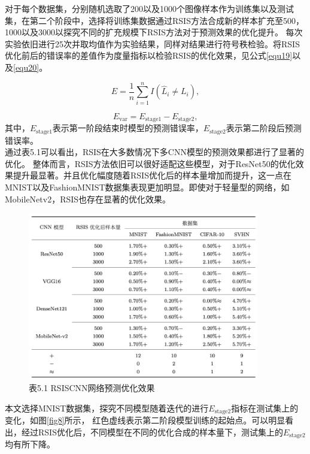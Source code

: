\documentclass{NauThesis}
\begin{document}
对于每个数据集，分别随机选取了200以及1000个图像样本作为训练集以及测试集，在第二个阶段中，选择将训练集数据通过RSIS方法合成新的样本扩充至500，1000以及3000以探究不同的扩充规模下RSIS方法对于预测效果的优化提升。
每次实验依旧进行25次并取均值作为实验结果，同样对结果进行符号秩检验。将RSIS优化前后的错误率的差值作为度量指标以检验RSIS的优化效果，见公式\eqref{equ19}以及\eqref{equ20}。

\begin{equation}\label{equ19}
    E=\dfrac{1}{n}\sum\limits_{i=1}^n{I}(\hat{L}_i\neq L_i),
\end{equation}

\begin{equation}\label{equ20}
    E_{\text{var}}=E_{\text{stage1}}-E_{\text{stage2}},
\end{equation}
其中，$E_{\text{stage1}}$表示第一阶段结束时模型的预测错误率，$E_{\text{stage2}}$表示第二阶段后预测错误率。
\\\hspace*{2em}通过表5.1可以看出，RSIS在大多数情况下多CNN模型的预测效果都进行了显著的优化。
整体而言，RSIS方法依旧可以很好适配这些模型，对于ResNet50的优化效果提升最显著。并且优化幅度随着RSIS优化后的样本量增加而提升，这一点在MNIST以及FashionMNIST数据集表现更加明显。即使对于轻量型的网络，如MobileNetv2，RSIS也存在显著的优化效果。

\begin{figure}[htbp]
    \centering
    \label{tab5}
    \caption*{表5.1 RSISCNN网络预测优化效果}
    \includegraphics[width=0.9\textwidth]{figs/tab5.png}
\end{figure}

\newpage
本文选择MNIST数据集，探究不同模型随着迭代的进行$E_{\text{stage2}}$指标在测试集上的变化，如图\ref{fig8}所示，
红色虚线表示第二阶段模型训练的起始点。可以明显看出，经过RSIS优化后，不同模型在不同的优化合成的样本量下，测试集上的$E_{\text{stage2}}$均有所下降。
\end{document}
